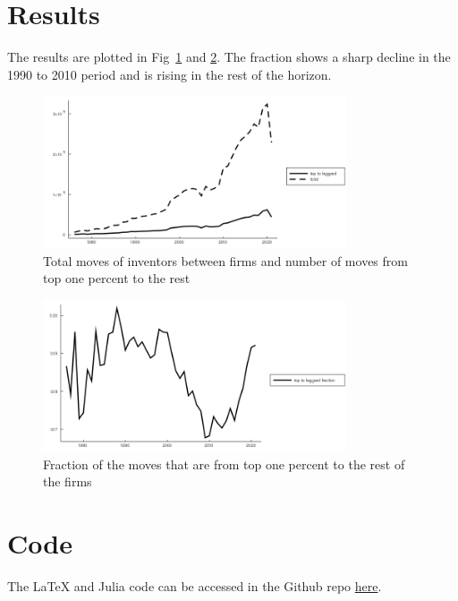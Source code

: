\documentclass{report}
\numberwithin{equation}{section}
\numberwithin{figure}{section}
\numberwithin{table}{section}
\begin{document}
\section{Results}

The results are plotted in Fig~\ref{fig:f1} and \ref{fig:f2}. The fraction shows a sharp decline in the 1990 to 2010 period and is rising in the rest of the horizon. 
\begin{figure}
    \centering
    \includegraphics[width = 0.8\textwidth]{input/total_moves.png}
    \caption{Total moves of inventors between firms and number of moves from top one percent to the rest}
    \label{fig:f1}
\end{figure}

\begin{figure}
    \centering
    \includegraphics[width = 0.8\textwidth]{input/fraction.png}
    \caption{Fraction of the moves that are from top one percent to the rest of the firms}
    \label{fig:f2}
\end{figure}

\section{Code}

The LaTeX and Julia code can be accessed in the Github repo \href{https://github.com/econ-raman/code_share/tree/main/patent_exercise}{here}.

\end{document}
